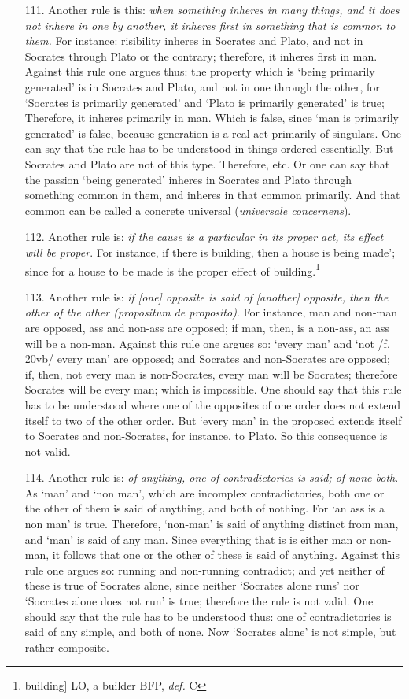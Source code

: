 \begin{itemize}
\item[111.] Another rule is this: \textit{when something inheres in many things, and it does not inhere in one by another, it inheres first in something that is common to them.} For instance: risibility inheres in Socrates and Plato, and not in Socrates through Plato or the contrary; therefore, it inheres first in man. Against this rule one argues thus: the property which is `being primarily generated' is in Socrates and Plato, and not in one through the other, for `Socrates is primarily generated' and `Plato is primarily generated' is true; Therefore, it inheres primarily in man. Which is false, since `man is primarily generated' is false, because generation is a real act primarily of singulars. One can say that the rule has to be understood in things ordered essentially. But Socrates and Plato are not of this type. Therefore, etc. Or one can say that the passion `being generated' inheres in Socrates and Plato through something common in them, and inheres in that common primarily. And that common can be called a concrete universal (\textit{universale concernens}).
\item[112.] Another rule is: \textit{if the cause is a particular in its proper act, its effect will be proper}. For instance, if there is building, then a house is being made'; since for a house to be made is the proper effect of building.\footnote{building] LO, a builder BFP, \textit{def.} C}
\item[113.] Another rule is: \textit{if [one] opposite is said of [another] opposite, then the other of the other (\textit{propositum de proposito})}. For instance, man and non-man are opposed, ass and non-ass are opposed; if man, then, is a non-ass, an ass will be a non-man. Against this rule one argues so: `every man' and `not /f. 20vb/ every man' are opposed; and Socrates and non-Socrates are opposed; if, then, not every man is non-Socrates, every man will be Socrates; therefore Socrates will be every man; which is impossible. One should say that this rule has to be understood where one of the opposites of one order does not extend itself to two of the other order. But `every man' in the proposed extends itself to Socrates and non-Socrates, for instance, to Plato. So this consequence is not valid.
\item[114.] Another rule is: \textit{of anything, one of contradictories is said; of none both}. As `man' and `non man', which are incomplex contradictories, both one or the other of them is said of anything, and both of nothing. For `an ass is a non man' is true. Therefore, `non-man' is said of anything distinct from man, and `man' is said of any man. Since everything that is is either man or non-man, it follows that one or the other of these is said of anything. Against this rule one argues so: running and non-running contradict; and yet neither of these is true of Socrates alone, since neither `Socrates alone runs' nor `Socrates alone does not run' is true; therefore the rule is not valid. One should say that the rule has to be understood thus: one of contradictories is said of any simple, and both of none. Now `Socrates alone' is not simple, but rather composite.

\end{itemize}
